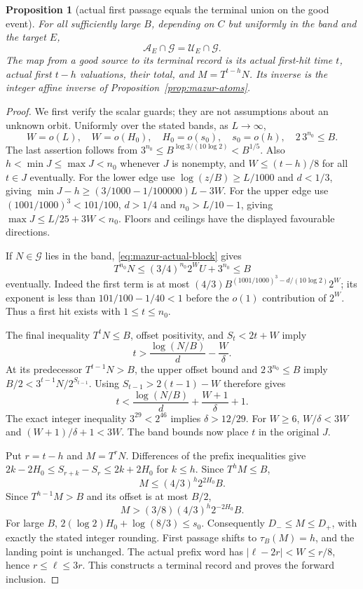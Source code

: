 \documentclass[11pt]{article}
\newtheorem{proposition}{Proposition}
\theoremstyle{remark}\newtheorem{remark}[proposition]{Remark}
\begin{document}
\begin{proposition}[actual first passage equals the terminal union on the good event]
\label{prop:mazur-genuine-coverage}
For all sufficiently large $B$, depending on $C$ but uniformly in
the band and the target $E$,
\begin{equation}
 \mathcal A_E\cap\mathcal G=\mathcal U_E\cap\mathcal G.
 \label{eq:mazur-genuine-coverage}
\end{equation}
The map from a good source to its terminal record is its actual first-hit
time $t$, actual first $t-h$ valuations, their total, and $M=T^{t-h}N$.
Its inverse is the integer affine inverse of
Proposition~\ref{prop:mazur-atoms}.
\end{proposition}
\begin{proof}
We first verify the scalar guards; they are not assumptions about an
unknown orbit. Uniformly over the stated bands, as $L\to\infty$,
\[
 W=o(L),\quad W=o(H_0),\quad H_0=o(s_0),\quad s_0=o(h),\quad
 2\,3^{n_0}\le B.
\]
The last assertion follows from
$3^{n_0}\le B^{\log3/(10\log2)}<B^{1/5}$.
Also $h<\min J\le\max J<n_0$ whenever $J$ is nonempty, and
$W\le(t-h)/8$ for all $t\in J$ eventually.
For the lower edge use
$\log(z/B)\ge L/1000$ and $d<1/3$, giving
$\min J-h\ge(3/1000-1/100000)L-3W$.
For the upper edge use $(1001/1000)^3<101/100$, $d>1/4$ and
$n_0>L/10-1$, giving $\max J\le L/25+3W<n_0$.
Floors and ceilings have the displayed favourable directions.

If $N\in\mathcal G$ lies in the band, \eqref{eq:mazur-actual-block} gives
\[
 T^{n_0}N\le(3/4)^{n_0}2^W U+3^{n_0}\le B
\]
eventually. Indeed the first term is at most
$(4/3)B^{(1001/1000)^3-d/(10\log2)}2^W$;
its exponent is less than $101/100-1/40<1$ before the $o(1)$
contribution of $2^W$. Thus a first hit exists with $1\le t\le n_0$.

The final inequality $T^tN\le B$, offset positivity, and
$S_t<2t+W$ imply
\[
 t>\frac{\log(N/B)}d-\frac W\delta.
\]
At its predecessor $T^{t-1}N>B$, the upper offset bound and
$2\,3^{n_0}\le B$ imply
$B/2<3^{t-1}N/2^{S_{t-1}}$.
Using $S_{t-1}>2(t-1)-W$ therefore gives
\[
 t<\frac{\log(N/B)}d+\frac{W+1}{\delta}+1.
\]
The exact integer inequality $3^{29}<2^{46}$ implies
$\delta>12/29$. For $W\ge6$,
$W/\delta<3W$ and $(W+1)/\delta+1<3W$.
The band bounds now place $t$ in the original $J$.

Put $r=t-h$ and $M=T^rN$.
Differences of the prefix inequalities give
$2k-2H_0\le S_{r+k}-S_r\le2k+2H_0$ for $k\le h$.
Since $T^hM\le B$,
\[
 M\le(4/3)^h2^{2H_0}B.
\]
Since $T^{h-1}M>B$ and its offset is at most $B/2$,
\[
 M>(3/8)(4/3)^h2^{-2H_0}B.
\]
For large $B$, $2(\log2)H_0+\log(8/3)\le s_0$.
Consequently $D_-\le M\le D_+$, with exactly the stated integer
rounding. First passage shifts to $\tau_B(M)=h$, and the landing
point is unchanged. The actual prefix word has
$|\ell-2r|<W\le r/8$, hence $r\le\ell\le3r$.
This constructs a terminal record and proves the forward inclusion.


\end{proof}
\end{document}
